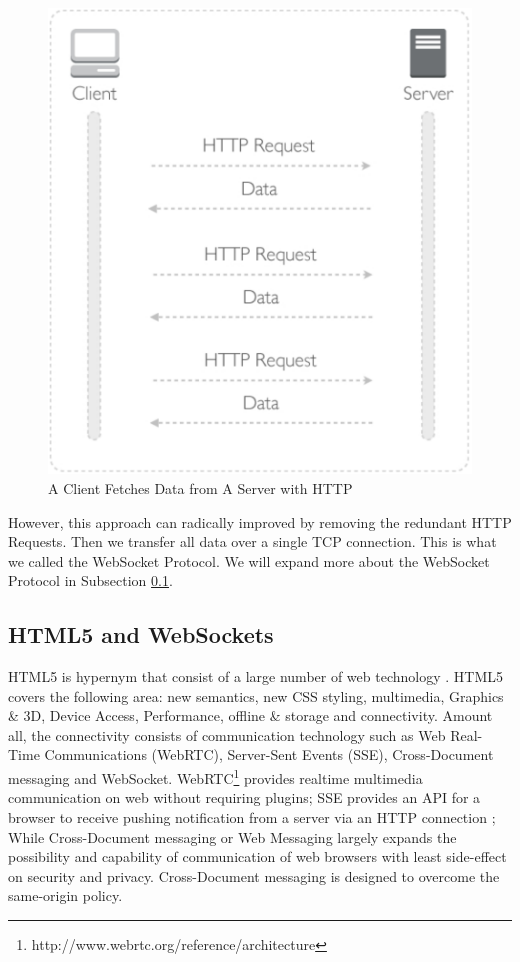 \begin{figure}[ht]
  \begin{center}
    \includegraphics[width=1\textwidth]{images/client-server-http.pdf}
    \caption{A Client Fetches Data from A Server with HTTP}
    \label{fig:client-server-http}
  \end{center}
\end{figure}


However, this approach can radically improved by removing the redundant HTTP Requests. Then we transfer all data over a single TCP connection. This is what we called the WebSocket Protocol. We will expand more about the WebSocket Protocol in Subsection \ref{HTML5andWebSockets}.

\subsection{HTML5 and WebSockets}
\label{HTML5andWebSockets}

HTML5 is hypernym that consist of a large number of web technology \cite{wang2012definitive}. HTML5 covers the following area: new semantics, new CSS styling, multimedia, Graphics \& 3D, Device Access, Performance, offline \& storage and connectivity. Amount all, the connectivity consists of communication technology such as Web Real-Time Communications (WebRTC), Server-Sent Events (SSE), Cross-Document messaging and WebSocket. WebRTC\footnote{http://www.webrtc.org/reference/architecture} provides realtime multimedia communication on web without requiring plugins; SSE provides an API for a browser to receive pushing notification from a server via an HTTP connection \cite{hickson2009server}; While Cross-Document messaging or Web Messaging largely expands the possibility and capability of communication of web browsers with least side-effect on security and privacy. Cross-Document messaging is designed to overcome the same-origin policy.

